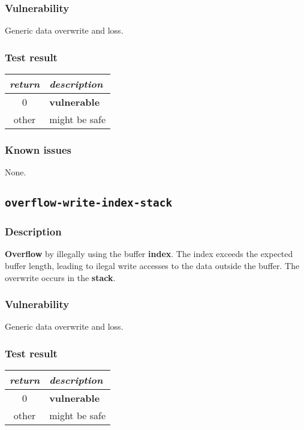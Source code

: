 \documentclass[a4paper]{book}
\begin{document}
\subsubsection{Vulnerability}
Generic data overwrite and loss.

\subsubsection{Test result}
\begin{tabular}{cl}
  \toprule
  \emph{return}  & \emph{description} \\
  \midrule
  0              & \textbf{vulnerable} \\
  other          & might be safe \\
  \bottomrule
\end{tabular}

\subsubsection{Known issues}

None.

\newpage

\subsection{\texttt{overflow-write-index-stack}}\label{test-overflow-write-index-stack}

\subsubsection{Description}

\textbf{Overflow} by illegally using the buffer \textbf{index}.
The index exceeds the expected buffer length,
leading to ilegal write accesses to the data outside the buffer.
The overwrite occurs in the \textbf{stack}.

\subsubsection{Vulnerability}
Generic data overwrite and loss.

\subsubsection{Test result}
\begin{tabular}{cl}
  \toprule
  \emph{return}  & \emph{description} \\
  \midrule
  0              & \textbf{vulnerable} \\
  other          & might be safe \\
  \bottomrule
\end{tabular}
\end{document}
